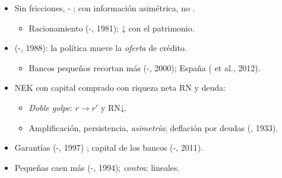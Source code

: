 \documentclass{article}
\begin{document}
\begin{columnas}
\begin{itemize}
\item Sin fricciones, - ; con información asimétrica, no .
  \begin{itemize}
  \item Racionamiento (-, 1981);  ↓ con el patrimonio.
  \end{itemize}
\item {} (-, 1988): la política mueve la \emph{oferta} de crédito.
  \begin{itemize}
  \item Bancos pequeños recortan más (-, 2000); España ( et al., 2012).
  \end{itemize}
\end{itemize}
\begin{itemize}
\item NEK con capital comprado con riqueza neta RN y deuda:
  \begin{itemize}
  \item \emph{Doble golpe}: $r\to r'$ y RN↓.
  \item Amplificación, persistencia, \emph{asimetría}; deflación por deudas (, 1933).
  \end{itemize}
\end{itemize}
\begin{itemize}
\item Garantías (-, 1997) ; capital de los bancos (-, 2011).
\item Pequeñas caen más (-, 1994); \emph{contra}: lineales.
\end{itemize}


\end{columnas}
\end{document}
